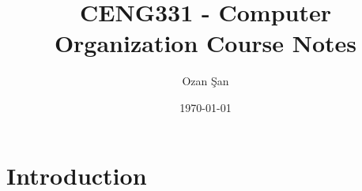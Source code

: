 \documentclass{article}
\title{CENG331 - Computer Organization Course Notes}
\author{Ozan Şan}
\date{\today}
\begin{document}
\maketitle

\section{Introduction}
\end{document}
